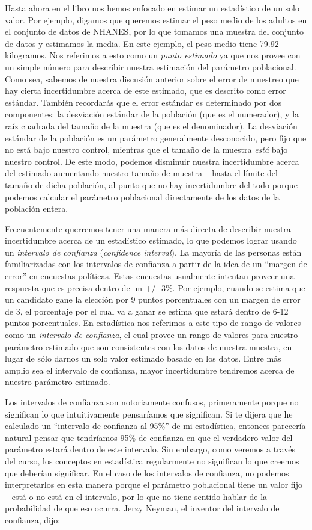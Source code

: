 \documentclass[
  12pt,
]{book}
\begin{document}
Hasta ahora en el libro nos hemos enfocado en estimar un estadístico de un solo valor. Por ejemplo, digamos que queremos estimar el peso medio de los adultos en el conjunto de datos de NHANES, por lo que tomamos una muestra del conjunto de datos y estimamos la media. En este ejemplo, el peso medio tiene 79.92 kilogramos. Nos referimos a esto como un \emph{punto estimado} ya que nos provee con un simple número para describir nuestra estimación del parámetro poblacional. Como sea, sabemos de nuestra discusión anterior sobre el error de muestreo que hay cierta incertidumbre acerca de este estimado, que es descrito como error estándar. También recordarás que el error estándar es determinado por dos componentes: la desviación estándar de la población (que es el numerador), y la raíz cuadrada del tamaño de la muestra (que es el denominador). La desviación estándar de la población es un parámetro generalmente desconocido, pero fijo que no está bajo nuestro control, mientras que el tamaño de la muestra \emph{está} bajo nuestro control. De este modo, podemos disminuir nuestra incertidumbre acerca del estimado aumentando nuestro tamaño de muestra -- hasta el límite del tamaño de dicha población, al punto que no hay incertidumbre del todo porque podemos calcular el parámetro poblacional directamente de los datos de la población entera.

Frecuentemente querremos tener una manera más directa de describir nuestra incertidumbre acerca de un estadístico estimado, lo que podemos lograr usando un \emph{intervalo de confianza} (\emph{confidence interval}). La mayoría de las personas están familiarizadas con los intervalos de confianza a partir de la idea de un ``margen de error'' en encuestas políticas. Estas encuestas usualmente intentan proveer una respuesta que es precisa dentro de un +/- 3\%. Por ejemplo, cuando se estima que un candidato gane la elección por 9 puntos porcentuales con un margen de error de 3, el porcentaje por el cual va a ganar se estima que estará dentro de 6-12 puntos porcentuales. En estadística nos referimos a este tipo de rango de valores como un \emph{intervalo de confianza}, el cual provee un rango de valores para nuestro parámetro estimado que son consistentes con los datos de nuestra muestra, en lugar de sólo darnos un solo valor estimado basado en los datos. Entre más amplio sea el intervalo de confianza, mayor incertidumbre tendremos acerca de nuestro parámetro estimado.

Los intervalos de confianza son notoriamente confusos, primeramente porque no significan lo que intuitivamente pensaríamos que significan. Si te dijera que he calculado un ``intervalo de confianza al 95\%'' de mi estadística, entonces parecería natural pensar que tendríamos 95\% de confianza en que el verdadero valor del parámetro estará dentro de este intervalo. Sin embargo, como veremos a través del curso, los conceptos en estadística regularmente no significan lo que creemos que deberían significar. En el caso de los intervalos de confianza, no podemos interpretarlos en esta manera porque el parámetro poblacional tiene un valor fijo -- está o no está en el intervalo, por lo que no tiene sentido hablar de la probabilidad de que eso ocurra. Jerzy Neyman, el inventor del intervalo de confianza, dijo:
\end{document}
